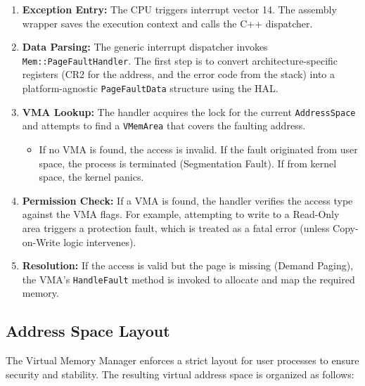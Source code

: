 \documentclass[a4paper,10pt,twoside]{report}
\theoremstyle{definition}
\begin{document}
\begin{enumerate}
    \item \textbf{Exception Entry:} The CPU triggers interrupt vector 14. The assembly wrapper saves the execution context and calls the C++ dispatcher.
    \item \textbf{Data Parsing:} The generic interrupt dispatcher invokes \texttt{Mem::PageFaultHandler}. The first step is to convert architecture-specific registers (CR2 for the address, and the error code from the stack) into a platform-agnostic \texttt{PageFaultData} structure using the HAL.
    
    \item \textbf{VMA Lookup:} The handler acquires the lock for the current \texttt{AddressSpace} and attempts to find a \texttt{VMemArea} that covers the faulting address.
    \begin{itemize}
        \item If no VMA is found, the access is invalid. If the fault originated from user space, the process is terminated (Segmentation Fault). If from kernel space, the kernel panics.
    \end{itemize}

    \item \textbf{Permission Check:} If a VMA is found, the handler verifies the access type against the VMA flags. For example, attempting to write to a Read-Only area triggers a protection fault, which is treated as a fatal error (unless Copy-on-Write logic intervenes).
    
    \item \textbf{Resolution:} If the access is valid but the page is missing (Demand Paging), the VMA's \texttt{HandleFault} method is invoked to allocate and map the required memory.
\end{enumerate}

\subsection{Address Space Layout}

The Virtual Memory Manager enforces a strict layout for user processes to ensure security and stability. The resulting virtual address space is organized as follows:
\end{document}
